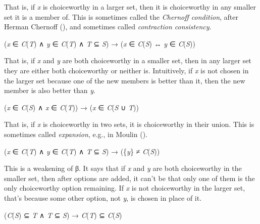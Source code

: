 \documentclass[
  11pt,
  letterpaper,
  DIV=11,
  numbers=noendperiod,
  twoside]{scrartcl}
\providecommand{\tightlist}{%
  \setlength{\itemsep}{0pt}\setlength{\parskip}{0pt}}
\begin{document}
That is, if \emph{x} is choiceworthy in a larger set, then it is
choiceworthy in any smaller set it is a member of. This is sometimes
called the \emph{Chernoff condition}, after Herman Chernoff
(), and sometimes called
\emph{contraction consistency}.

\begin{description}
\tightlist
\item[Property β]
(\emph{x} ∈ \emph{C}(\emph{T}) ∧ \emph{y} ∈ \emph{C}(\emph{T}) ∧
\emph{T} ⊆ \emph{S}) → (\emph{x} ∈ \emph{C}(\emph{S}) ↔ \emph{y} ∈
\emph{C}(\emph{S}))
\end{description}

That is, if \emph{x} and \emph{y} are both choiceworthy in a smaller
set, then in any larger set they are either both choiceworthy or neither
is. Intuitively, if \emph{x} is not chosen in the larger set because one
of the new members is better than it, then the new member is also better
than \emph{y}.

\begin{description}
\tightlist
\item[Property γ]
(\emph{x} ∈ \emph{C}(\emph{S}) ∧ \emph{x} ∈ \emph{C}(\emph{T})) →
(\emph{x} ∈ \emph{C}(\emph{S} ∪ \emph{T}))
\end{description}

That is, if \emph{x} is choiceworthy in two sets, it is choiceworthy in
their union. This is sometimes called \emph{expansion}, e.g., in Moulin
().

\begin{description}
\tightlist
\item[Property δ]
(\emph{x} ∈ \emph{C}(\emph{T}) ∧ \emph{y} ∈ \emph{C}(\emph{T}) ∧
\emph{T} ⊆ \emph{S}) → (\{\emph{y}\} ≠ \emph{C}(\emph{S}))
\end{description}

This is a weakening of β. It says that if \emph{x} and \emph{y} are both
choiceworthy in the smaller set, then after options are added, it can't
be that only one of them is the only choiceworthy option remaining. If
\emph{x} is not choiceworthy in the larger set, that's because some
other option, not \emph{y}, is chosen in place of it.

\begin{description}
\tightlist
\item[Property Aiz]
(\emph{C}(\emph{S}) ⊆ \emph{T} ∧ \emph{T} ⊆ \emph{S}) →
\emph{C}(\emph{T}) ⊆ \emph{C}(\emph{S})
\end{description}
\end{document}
